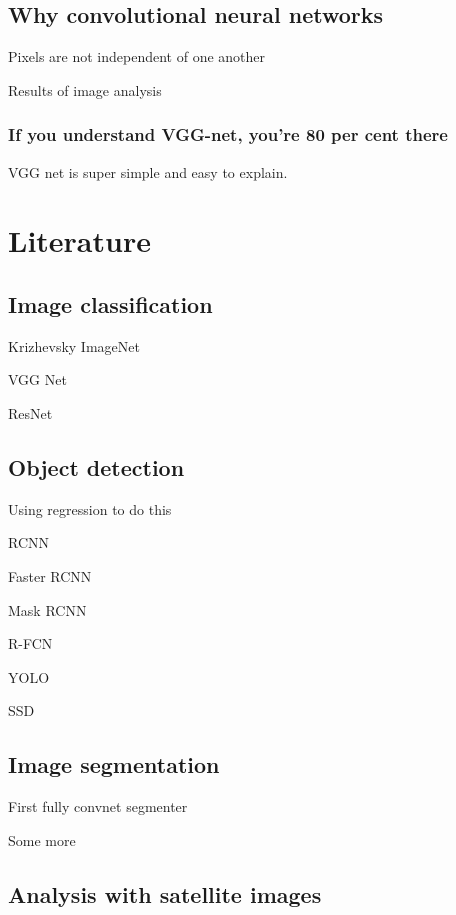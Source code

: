 \documentclass[12pt, a4paper, oneside, headinclude, footinclude]{article}
\begin{document}
\subsection{Why convolutional neural networks}

Pixels are not independent of one another

Results of image analysis

\subsubsection{If you understand VGG-net, you're 80 per cent there}

VGG net is super simple and easy to explain.

\section{Literature}

\subsection{Image classification}

Krizhevsky ImageNet~\cite{NIPS2012_4824}

VGG Net~\cite{SimonyanZ14a}

ResNet~\cite{he2016deep}

\subsection{Object detection}
Using regression to do this~\cite{NIPS2013_5207}

RCNN~\cite{Girshick2014, Girshick2015}

Faster RCNN~\cite{Ren2017}

Mask RCNN~\cite{he2017}

R-FCN~\cite{NIPS2016_6465}

YOLO~\cite{redmon2016yolo}

SSD~\cite{liu2016ssd}

    
\subsection{Image segmentation}

First fully convnet segmenter~\cite{long2015fully}

Some more~\cite{chen2018, NIPS2015_5852}


\subsection{Analysis with satellite images}
\end{document}

